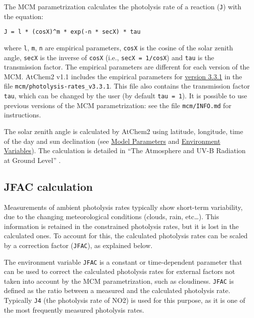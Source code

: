 The MCM parametrization calculates the photolysis rate of a reaction
(\texttt{J}) with the equation:

\begin{verbatim}
J = l * (cosX)^m * exp(-n * secX) * tau
\end{verbatim}

where \texttt{l}, \texttt{m}, \texttt{n} are empirical parameters,
\texttt{cosX} is the cosine of the solar zenith angle, \texttt{secX}
is the inverse of \texttt{cosX} (i.e., \texttt{secX\ =\ 1/cosX}) and
\texttt{tau} is the transmission factor. The empirical parameters are
different for each version of the MCM. AtChem2 v1.1 includes the
empirical parameters for
\href{http://mcm.leeds.ac.uk/MCM/parameters/photolysis_param.htt}{version
  3.3.1} in the file \texttt{mcm/photolysis-rates\_v3.3.1}. This file
also contains the transmission factor \texttt{tau}, which can be
changed by the user (by default \texttt{tau\ =\ 1}). It is possible to
use previous versions of the MCM parametrization: see the file
\texttt{mcm/INFO.md} for instructions.

The solar zenith angle is calculated by AtChem2 using latitude,
longitude, time of the day and sun declination (see
\hyperref[sec:model-parameters]{Model Parameters} and
\hyperref[sec:environment-variables]{Environment Variables}). The
calculation is detailed in ``The Atmosphere and UV-B Radiation at
Ground Level'' \citep{Madronich_1993}.

\subsection{JFAC calculation} \label{subsec:jfac-calculation}

Measurements of ambient photolysis rates typically show short-term
variability, due to the changing meteorological conditions (clouds,
rain, etc\ldots{}). This information is retained in the constrained
photolysis rates, but it is lost in the calculated ones. To account
for this, the calculated photolysis rates can be scaled by a
correction factor (\texttt{JFAC}), as explained below.

The environment variable \texttt{JFAC} is a constant or time-dependent
parameter that can be used to correct the calculated photolysis rates
for external factors not taken into account by the MCM
parametrization, such as cloudiness. \texttt{JFAC} is defined as the
ratio between a measured and the calculated photolysis rate. Typically
\texttt{J4} (the photolysis rate of NO2) is used for this purpose, as
it is one of the most frequently measured photolysis rates.

